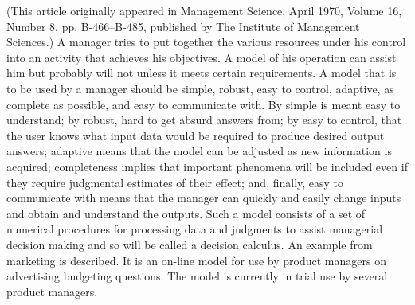 (This article originally appeared in Management Science, April 1970, Volume 16, Number 8, pp. B-466–B-485, published by The Institute of Management Sciences.) A manager tries to put together the various resources under his control into an activity that achieves his objectives. A model of his operation can assist him but probably will not unless it meets certain requirements. A model that is to be used by a manager should be simple, robust, easy to control, adaptive, as complete as possible, and easy to communicate with. By simple is meant easy to understand; by robust, hard to get absurd answers from; by easy to control, that the user knows what input data would be required to produce desired output answers; adaptive means that the model can be adjusted as new information is acquired; completeness implies that important phenomena will be included even if they require judgmental estimates of their effect; and, finally, easy to communicate with means that the manager can quickly and easily change inputs and obtain and understand the outputs. Such a model consists of a set of numerical procedures for processing data and judgments to assist managerial decision making and so will be called a decision calculus. An example from marketing is described. It is an on-line model for use by product managers on advertising budgeting questions. The model is currently in trial use by several product managers.
